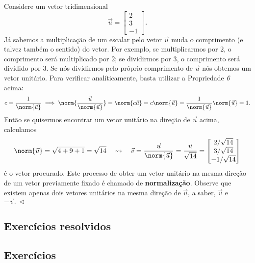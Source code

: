 \begin{ex}
	Considere um vetor tridimensional
	\begin{equation}
	\vec{u} =
	\begin{bmatrix}
	2 \\ 3 \\ -1
	\end{bmatrix}.
	\end{equation} Já sabemos a multiplicação de um escalar pelo vetor $\vec{u}$ muda o comprimento (e talvez também o sentido) do vetor. Por exemplo, se multiplicarmos por $2$, o comprimento será multiplicado por $2$; se dividirmos por $3$, o comprimento será dividido por $3$. Se nós dividirmos pelo próprio comprimento de $\vec{u}$ nós obtemos um vetor unitário. Para verificar analíticamente, basta utilizar a Propriedade \textit{6} acima:
	\begin{equation}
	c = \frac{1}{\norm{\vec{u}}} \implies \norm{\frac{\vec{u}}{\norm{\vec{u}}} } = \norm{c \vec{u}} = c \norm{\vec{u}} = \frac{1}{\norm{\vec{u}}}\norm{\vec{u}} = 1.
	\end{equation} Então se quisermos encontrar um vetor unitário na direção de $\vec{u}$ acima, calculamos
	\begin{equation}
	\norm{\vec{u}} = \sqrt{4 + 9 + 1} = \sqrt{14} \quad \rightsquigarrow \quad \vec{v} = \frac{\vec{u}}{\norm{\vec{u}}} = \frac{\vec{u}}{\sqrt{14}} =
	\begin{bmatrix}
	2/\sqrt{14} \\ 3/\sqrt{14} \\ -1/\sqrt{14}
	\end{bmatrix}
	\end{equation} é o vetor procurado. Este processo de obter um vetor unitário na mesma direção de um vetor previamente fixado é chamado de \textbf{normalização}. Observe que existem apenas dois vetores unitários na mesma direção de $\vec{u}$, a saber, $\vec{v}$ e $- \vec{v}. \ \lhd$
\end{ex}

\subsection*{Exercícios resolvidos}

\construirExeresol

\subsection*{Exercícios}

\construirExer

